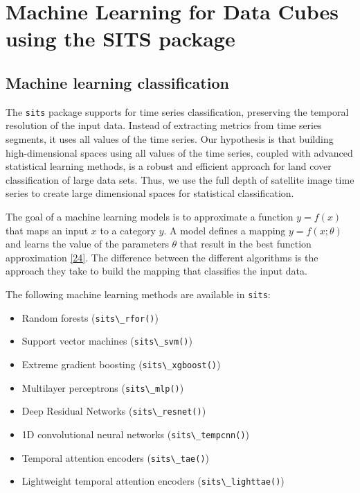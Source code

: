 \documentclass[
  11pt,
]{report}
\newcommand{\passthrough}[1]{#1}
\providecommand{\tightlist}{%
  \setlength{\itemsep}{0pt}\setlength{\parskip}{0pt}}
\begin{document}
\hypertarget{machine-learning-for-data-cubes-using-the-sits-package}{%
\chapter*{Machine Learning for Data Cubes using the SITS
package}\label{machine-learning-for-data-cubes-using-the-sits-package}}

\hypertarget{machine-learning-classification}{%
\section*{Machine learning
classification}\label{machine-learning-classification}}

The \passthrough{\lstinline!sits!} package supports for time series
classification, preserving the temporal resolution of the input data.
Instead of extracting metrics from time series segments, it uses all
values of the time series. Our hypothesis is that building
high-dimensional spaces using all values of the time series, coupled
with advanced statistical learning methods, is a robust and efficient
approach for land cover classification of large data sets. Thus, we use
the full depth of satellite image time series to create large
dimensional spaces for statistical classification.

The goal of a machine learning models is to approximate a function
\(y = f(x)\) that maps an input \(x\) to a category \(y\). A model
defines a mapping \(y = f(x;\theta)\) and learns the value of the
parameters \(\theta\) that result in the best function approximation
\protect\hyperlink{ref-Goodfellow2016}{{[}24{]}}. The difference between
the different algorithms is the approach they take to build the mapping
that classifies the input data.

The following machine learning methods are available in
\passthrough{\lstinline!sits!}:

\begin{itemize}
\tightlist
\item
  Random forests (\passthrough{\lstinline!sits\_rfor()!})
\item
  Support vector machines (\passthrough{\lstinline!sits\_svm()!})
\item
  Extreme gradient boosting (\passthrough{\lstinline!sits\_xgboost()!})
\item
  Multilayer perceptrons (\passthrough{\lstinline!sits\_mlp()!})
\item
  Deep Residual Networks (\passthrough{\lstinline!sits\_resnet()!})
\item
  1D convolutional neural networks
  (\passthrough{\lstinline!sits\_tempcnn()!})
\item
  Temporal attention encoders (\passthrough{\lstinline!sits\_tae()!})
\item
  Lightweight temporal attention encoders
  (\passthrough{\lstinline!sits\_lighttae()!})
\end{itemize}
\end{document}
